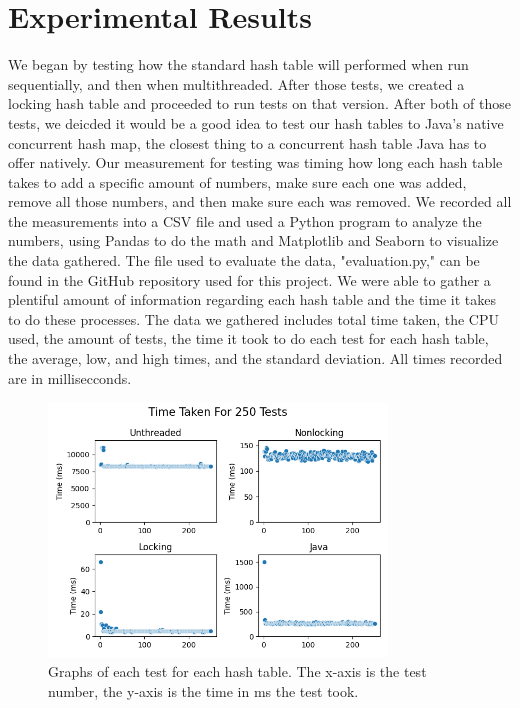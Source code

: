 \documentclass[conference]{IEEEtran}
\begin{document}
\section{Experimental Results}
We began by testing how the standard hash table will performed when run sequentially, and then when multithreaded. 
After those tests, we created a locking hash table and proceeded to run tests on that version. 
After both of those tests, we deicded it would be a good idea to test our hash tables to Java's native concurrent hash map, the closest thing to a concurrent hash table Java has to offer natively.
Our measurement for testing was timing how long each hash table takes to add a specific amount of numbers, make sure each one was added, remove all those numbers, and then make sure each was removed. 
We recorded all the measurements into a CSV file and used a Python program to analyze the numbers, using Pandas to do the math and Matplotlib and Seaborn to visualize the data gathered. The file used to evaluate the data, "evaluation.py," can be found in the GitHub repository used for this project.
We were able to gather a plentiful amount of information regarding each hash table and the time it takes to do these processes. 
The data we gathered includes total time taken, the CPU used, the amount of tests, the time it took to do each test for each hash table, the average, low, and high times, and the standard deviation. All times recorded are in millisecconds. 
\begin{figure}[htbp]
    \centerline{\includegraphics[width=90mm,scale=1]{250trials.png}}
    \caption{Graphs of each test for each hash table. The x-axis is the test number, the y-axis is the time in ms the test took. }
    \label{fig}
\end{figure}
\end{document}
